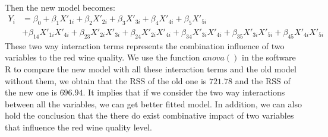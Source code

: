 \documentclass[11pt, oneside]{article}   	%
\begin{document}
\\
Then the new model becomes:
\begin{equation}
\begin{aligned}
Y_i&=\beta_0+\beta_1X'_{1i}+\beta_2X'_{2i}+\beta_3X'_{3i}+\beta_4X'_{4i}+\beta_5X'_{5i}\\
&+\beta_{14}X'_{1i}X'_{4i}+\beta_{23}X'_{2i}X'_{3i}+\beta_{24}X'_{2i}X'_{4i}+\beta_{34}X'_{3i}X'_{4i}+\beta_{35}X'_{3i}X'_{5i}+\beta_{45}X'_{4i}X'_{5i}
\end{aligned}
\end{equation}
These two way interaction terms represents the combination influence of two variables to the red wine quality. We use the function $anova()$ in the software R  to compare the new model with all these interaction terms and the old model without them, we obtain that the RSS of the old one is $721.78$ and the RSS of the new one is $696.94$. It implies that if we consider the two way interactions between all the variables, we can get better fitted model. In addition, we can also hold the conclusion that the there do exist combinative impact of two variables that influence the red wine quality level.
\end{document}
